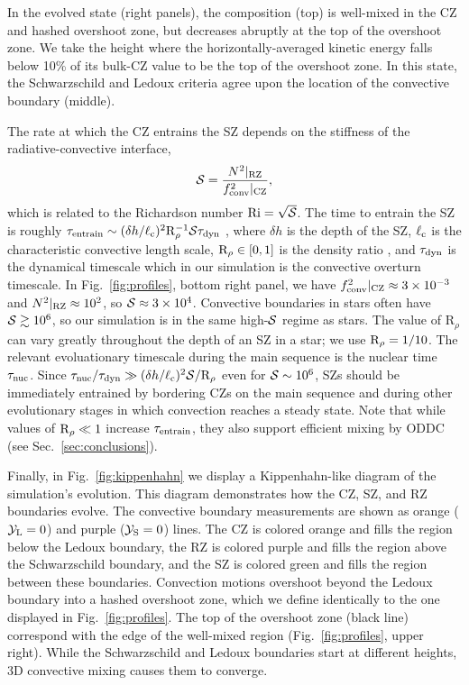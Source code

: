 In the evolved state (right panels), the composition (top) is well-mixed in the CZ and hashed overshoot zone, but decreases abruptly at the top of the overshoot zone.
We take the height where the horizontally-averaged kinetic energy falls below 10\% of its bulk-CZ value to be the top of the overshoot zone.
In this state, the Schwarzschild and Ledoux criteria agree upon the location of the convective boundary (middle).

The rate at which the CZ entrains the SZ depends on the stiffness of the radiative-convective interface,
\begin{equation}
\mS = \frac{N^2|_{\rm{RZ}}}{f_{\rm{conv}}^2|_{\rm{CZ}}},
\label{eqn:stiffness}
\end{equation}
which is related to the Richardson number ${\rm{Ri} = \sqrt{\mathcal{S}}}$.
The time to entrain the SZ is roughly ${\tau_{\rm{entrain}} \sim (\delta h / \ell_{\rm{c}})^2 \rm{R}_{\rho}^{-1} \mathcal{S} \tau_{\rm{dyn}}}$ \citep[per][eqn.~3]{fuentes_cumming_2020}, where $\delta h$ is the depth of the SZ, $\ell_{\rm{c}}$ is the characteristic convective length scale, $\mathrm{R}_{\rho} \in [0, 1]$ is the density ratio \citep[see][eqn.~7]{garaud_2018}, and $\tau_{\rm{dyn}}$ is the dynamical timescale which in our simulation is the convective overturn timescale.
In Fig.~\ref{fig:profiles}, bottom right panel, we have $f_{\rm{conv}}^2|_{\rm{CZ}} \approx 3 \times 10^{-3}$ and $N^2|_{\rm{RZ}} \approx 10^2$, so $\mathcal{S} \approx 3 \times 10^4$.
Convective boundaries in stars often have $\mathcal{S} \gtrsim 10^6$, so our simulation is in the same high-$\mathcal{S}$ regime as stars.
The value of $\mathrm{R}_{\rho}$ can vary greatly throughout the depth of an SZ in a star; we use $\rm{R}_\rho = 1/10$.
The relevant evoluationary timescale during the main sequence is the nuclear time $\tau_{\rm{nuc}}$.
Since $\tau_{\rm{nuc}}/\tau_{\rm{dyn}} \gg (\delta h/\ell_{\rm{c}})^2 \mathcal{S}/\mathrm{R}_{\rho}$ even for $\mathcal{S} \sim 10^6$, SZs should be immediately entrained by bordering CZs on the main sequence and during other evolutionary stages in which convection reaches a steady state.
Note that while values of $\mathrm{R}_{\rho} \ll 1$ increase $\tau_{\rm{entrain}}$, they also support efficient mixing by ODDC (see Sec.~\ref{sec:conclusions}).

Finally, in Fig.~\ref{fig:kippenhahn} we display a Kippenhahn-like diagram of the simulation's evolution.
This diagram demonstrates how the CZ, SZ, and RZ boundaries evolve.
The convective boundary measurements are shown as orange ($\mathcal{Y}_{\rm{L}} = 0$) and purple ($\mathcal{Y}_{\rm{S}} = 0$) lines.
The CZ is colored orange and fills the region below the Ledoux boundary, the RZ is colored purple and fills the region above the Schwarzschild boundary, and the SZ is colored green and fills the region between these boundaries.
Convection motions overshoot beyond the Ledoux boundary into a hashed overshoot zone, which we define identically to the one displayed in Fig.~\ref{fig:profiles}.
The top of the overshoot zone (black line) correspond with the edge of the well-mixed region (Fig.~\ref{fig:profiles}, upper right).
While the Schwarzschild and Ledoux boundaries start at different heights, 3D convective mixing causes them to converge.

